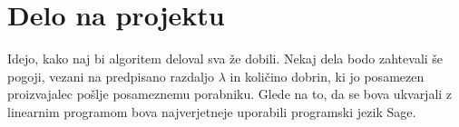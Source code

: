 \documentclass[a4paper, pt14]{article}
\begin{document}
\section{Delo na projektu}
Idejo, kako naj bi algoritem deloval sva že dobili. Nekaj dela bodo zahtevali še pogoji, vezani na predpisano razdaljo $\lambda$ in količino dobrin, ki jo posamezen proizvajalec pošlje posameznemu porabniku. Glede na to, da se bova ukvarjali z linearnim programom bova najverjetneje uporabili programski jezik Sage.
\end{document}
